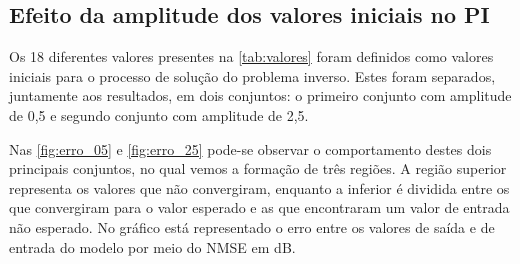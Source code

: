 
\subsection{Efeito da amplitude dos valores iniciais no PI} \label{subsec:estudoi-pi-efeito}
Os 18 diferentes valores presentes na \autoref{tab:valores} foram definidos como valores iniciais para o processo de solução do problema inverso. Estes foram separados, juntamente aos resultados, em dois conjuntos: o primeiro conjunto com amplitude de 0,5 e segundo conjunto com amplitude de 2,5.

Nas \autoref{fig:erro_05} e \autoref{fig:erro_25} pode-se observar o comportamento destes dois principais conjuntos, no qual vemos a formação de três regiões. A região superior representa os valores que não convergiram, enquanto a inferior é dividida entre os que convergiram para o valor esperado e as que encontraram um valor de entrada não esperado. No gráfico está representado o erro entre os valores de saída e de entrada do modelo por meio do NMSE em dB.

